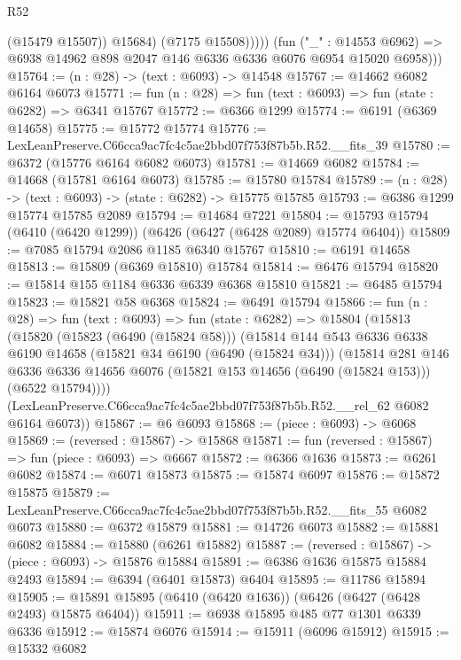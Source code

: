 \begin{lexlean}{R52}
\begin{coremodule}
                    (@15479 @15507))
                  @15684)
                (@7175 @15508)))))
        (fun ("_" : @14553 @6962) =>
        @6938 @14962 @898 @2047 @146 @6336 @6336 @6076 @6954 @15020 @6958)))
@15764 := (n : @28) -> (text : @6093) -> @14548
@15767 := @14662 @6082 @6164 @6073
@15771 := fun (n : @28) => fun (text : @6093) => fun (state : @6282) => @6341 @15767
@15772 := @6366 @1299
@15774 := @6191 (@6369 @14658)
@15775 := @15772 @15774
@15776 := LexLeanPreserve.C66cca9ac7fc4c5ae2bbd07f753f87b5b.R52.__fits_39
@15780 := @6372 (@15776 @6164 @6082 @6073)
@15781 := @14669 @6082
@15784 := @14668 (@15781 @6164 @6073)
@15785 := @15780 @15784
@15789 := (n : @28) -> (text : @6093) -> (state : @6282) -> @15775 @15785
@15793 := @6386 @1299 @15774 @15785 @2089
@15794 := @14684 @7221
@15804 := @15793 @15794 (@6410 (@6420 @1299)) (@6426 (@6427 (@6428 @2089) @15774 @6404))
@15809 := @7085 @15794 @2086 @1185 @6340 @15767
@15810 := @6191 @14658
@15813 := @15809 (@6369 @15810) @15784
@15814 := @6476 @15794
@15820 := @15814 @155 @1184 @6336 @6339 @6368 @15810
@15821 := @6485 @15794
@15823 := @15821 @58 @6368
@15824 := @6491 @15794
@15866 := fun (n : @28) =>
  fun (text : @6093) =>
  fun (state : @6282) =>
  @15804
    (@15813
      (@15820
        (@15823 (@6490 (@15824 @58)))
        (@15814
          @144
          @543
          @6336
          @6338
          @6190
          @14658
          (@15821 @34 @6190 (@6490 (@15824 @34)))
          (@15814
            @281
            @146
            @6336
            @6336
            @14656
            @6076
            (@15821 @153 @14656 (@6490 (@15824 @153)))
            (@6522 @15794))))
      (LexLeanPreserve.C66cca9ac7fc4c5ae2bbd07f753f87b5b.R52.__rel_62 @6082 @6164 @6073))
@15867 := @6 @6093
@15868 := (piece : @6093) -> @6068
@15869 := (reversed : @15867) -> @15868
@15871 := fun (reversed : @15867) => fun (piece : @6093) => @6667
@15872 := @6366 @1636
@15873 := @6261 @6082
@15874 := @6071 @15873
@15875 := @15874 @6097
@15876 := @15872 @15875
@15879 := LexLeanPreserve.C66cca9ac7fc4c5ae2bbd07f753f87b5b.R52.__fits_55 @6082 @6073
@15880 := @6372 @15879
@15881 := @14726 @6073
@15882 := @15881 @6082
@15884 := @15880 (@6261 @15882)
@15887 := (reversed : @15867) -> (piece : @6093) -> @15876 @15884
@15891 := @6386 @1636 @15875 @15884 @2493
@15894 := @6394 (@6401 @15873) @6404
@15895 := @11786 @15894
@15905 := @15891 @15895 (@6410 (@6420 @1636)) (@6426 (@6427 (@6428 @2493) @15875 @6404))
@15911 := @6938 @15895 @485 @77 @1301 @6339 @6336
@15912 := @15874 @6076
@15914 := @15911 (@6096 @15912)
@15915 := @15332 @6082

\end{coremodule}
\end{lexlean}
